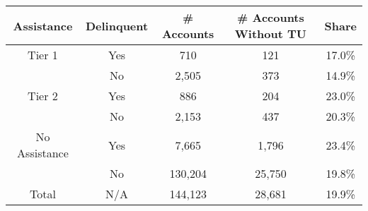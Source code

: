 \begin{tabular}{ccccc}
\toprule 
\midrule 
Assistance & Delinquent & \# Accounts & \# Accounts Without TU & Share \\
\midrule 
Tier 1 & Yes & 710 & 121 & 17.0\% \\
 & No & 2,505 & 373 & 14.9\% \\
\midrule 
Tier 2 & Yes & 886 & 204 & 23.0\% \\
 & No & 2,153 & 437 & 20.3\% \\
\midrule 
No Assistance & Yes & 7,665 & 1,796 & 23.4\% \\
 & No & 130,204 & 25,750 & 19.8\% \\
\midrule 
Total & N/A & 144,123 & 28,681 & 19.9\% \\
\midrule 
\bottomrule 
\end{tabular}
